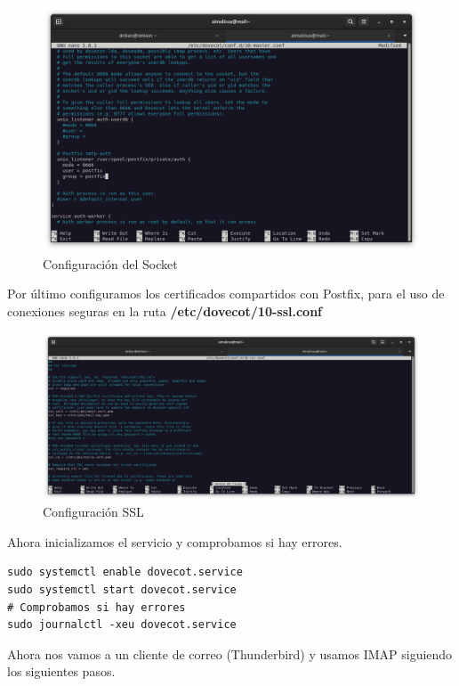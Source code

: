 \begin{figure}[H]
	\centering
	\includegraphics[scale=0.30]{14}
	\caption{Configuración del Socket}
\end{figure}

Por último configuramos los certificados compartidos con Postfix, para el uso de conexiones seguras en la ruta \textbf{/etc/dovecot/10-ssl.conf}

\begin{figure}[H]
	\centering
	\includegraphics[scale=0.25]{26}
	\caption{Configuración SSL}
\end{figure}

Ahora inicializamos el servicio y comprobamos si hay errores.
\begin{lstlisting}[style=mybash]
sudo systemctl enable dovecot.service
sudo systemctl start dovecot.service
# Comprobamos si hay errores
sudo journalctl -xeu dovecot.service
\end{lstlisting}

Ahora nos vamos a un cliente de correo (Thunderbird) y usamos IMAP siguiendo los siguientes pasos.

